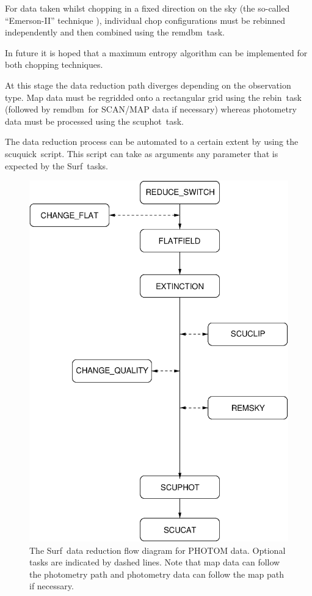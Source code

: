 \documentclass[twoside,11pt]{article}
\newcommand{\scusoft}          {{\sc Surf}}
\newcommand{\task}[1]{{\sf #1}}
\newcommand{\rebin}{\htmlref{\task{rebin}}{REBIN}}
\newcommand{\scuphot}{\htmlref{\task{scuphot}}{SCUPHOT}}
\newcommand{\scuquick}{\htmlref{\task{scuquick}}{SCUQUICK}}
\newcommand{\remdbm}{\htmlref{\task{remdbm}}{REMDBM}}
\newcommand{\htmlref}[2]{#1}
\newcommand{\htmlimage}[1]{}
\renewcommand{\_}{\texttt{\symbol{95}}}
\begin{document}
\begin{enumerate}
For data taken whilst chopping in a fixed direction on the sky
(the so-called ``Emerson-II'' technique \cite{EII}), individual
chop configurations must be rebinned independently and then combined
using the \remdbm\ task.

In future it is hoped that a maximum entropy algorithm
can be implemented \cite{R92} for both chopping techniques.


\end{enumerate}

At this stage the data reduction path diverges depending on the observation
type. Map data must be regridded onto a rectangular grid using the \rebin\
task (followed by \remdbm\ for SCAN/MAP data if necessary) whereas photometry
data must be processed using the \scuphot\ task.

The data reduction process can be automated to a certain extent by using the 
\scuquick{}ript. This script can take as arguments any parameter that is
expected by the \scusoft\ tasks.

\begin{figure}
\begin{center}
\includegraphics[width=5in]{sun216_flow_photom.eps}
\end{center}
\caption{The \scusoft\ data reduction flow diagram for PHOTOM
data. Optional tasks are
indicated by dashed lines. Note that map data can follow the photometry
path and photometry data can follow the map path if necessary.
}
\label{flowpath_phot}
\end{figure}
\end{document}
